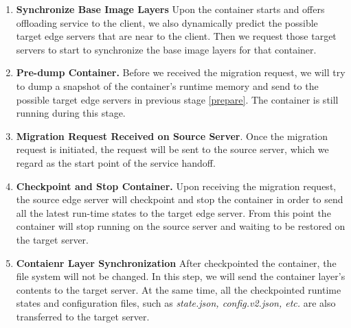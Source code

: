 \begin{enumerate}[label=\textbf{S\arabic*}]

\item \label{prepare} \textbf{%
Synchronize Base Image Layers} Upon the container starts and offers offloading service to the client, we also dynamically predict the possible target edge servers that are near to the client. Then we request those target servers to start to synchronize the base image layers for that container. 

\item \label{predump} \textbf{Pre-dump Container.} Before we received the migration request, we will try to dump a snapshot of the container's runtime memory and send to the possible target edge servers in previous stage \ref{prepare}. The container is still running during this stage. %

\item \label{request}\textbf{Migration Request Received on Source Server}. Once the migration request is initiated, the request will be sent to the source server, which we regard as the start point of the service handoff.


\item \label{checkpoint} \textbf{Checkpoint and Stop Container.} Upon receiving the migration request, the source edge server will checkpoint and stop the container in order to send all the latest run-time states to the target edge server.
From this point the container will stop running on the source server and waiting to be restored on the target server.

\item \label{fs-sync} \textbf{Contaienr Layer Synchronization} After checkpointed the container, the file system will not be changed. In this step, we will send the container layer's contents to the target server. At the same time, all the checkpointed runtime states and configuration files, such as \textit{state.json, config.v2.json, etc.} are also transferred to the target server. 


\end{enumerate}
